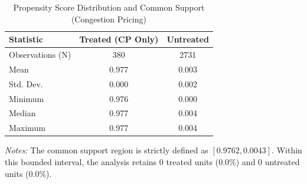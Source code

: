 \begin{table}[htbp]
\centering
\caption{Propensity Score Distribution and Common Support (Congestion Pricing)}
\label{tab:propensity_scores}
\begin{tabular}{lcc}
\toprule
Statistic & Treated (CP Only) & Untreated \\
\midrule
Observations (N) & 380 & 2731 \\
Mean & 0.977 & 0.003 \\
Std. Dev. & 0.000 & 0.002 \\
Minimum & 0.976 & 0.000 \\
Median & 0.977 & 0.004 \\
Maximum & 0.977 & 0.004 \\
\bottomrule
\end{tabular}

\vspace{1ex}
{\raggedright \footnotesize \textit{Notes:} The common support region is strictly defined as $[0.9762, 0.0043]$. 
Within this bounded interval, the analysis retains 0 treated units (0.0\%) and 0 untreated units (0.0\%).\par}
\end{table}
